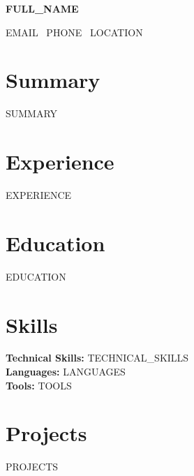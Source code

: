 \documentclass[a4paper,10pt]{article}
\newcommand{\name}[1]{
  \begin{center}
    {\Huge\bfseries\color{darkgray} #1}
  \end{center}
  \vspace{10pt}
}
\newcommand{\contact}[3]{
  \begin{center}
    \color{mediumgray}
    #1 \textbullet\ #2 \textbullet\ #3
  \end{center}
  \vspace{20pt}
}
\begin{document}
\name{{{FULL_NAME}}}
\contact{{{EMAIL}}}{{{PHONE}}}{{{LOCATION}}}

\section{Summary}
{{SUMMARY}}

\section{Experience}
{{EXPERIENCE}}

\section{Education}
{{EDUCATION}}

\section{Skills}
\textbf{Technical Skills:} {{TECHNICAL_SKILLS}} \\
\textbf{Languages:} {{LANGUAGES}} \\
\textbf{Tools:} {{TOOLS}}

\section{Projects}
{{PROJECTS}}
\end{document}
